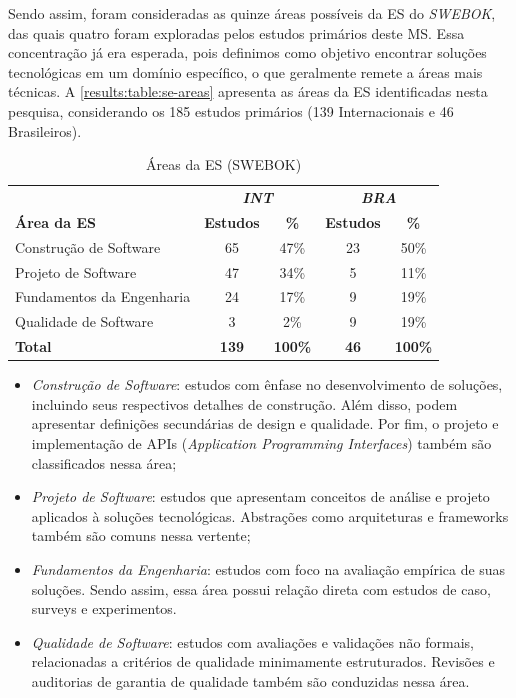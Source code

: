 Sendo assim, foram consideradas as quinze áreas possíveis da ES do \textit{SWEBOK}, das quais quatro foram exploradas pelos estudos primários deste MS. Essa concentração já era esperada, pois definimos como objetivo encontrar soluções tecnológicas em um domínio específico, o que geralmente remete a áreas mais técnicas. A \autoref{results:table:se-areas} apresenta as áreas da ES identificadas nesta pesquisa, considerando os 185 estudos primários (139 Internacionais e 46 Brasileiros).

\begin{table}[htbp]
\caption{Áreas da ES (SWEBOK)}
\label{results:table:se-areas}
\centering
\begin{tabular}{lcccc}
\hline
                          & \multicolumn{2}{c}{\textbf{\textit{INT}}} & \multicolumn{2}{c}{\textbf{\textit{BRA}}} \\ \cline{2-5} 
\textbf{Área da ES}       & \textbf{Estudos} & \textbf{\%}             & \textbf{Estudos} & \textbf{\%}             \\ \hline
Construção de Software    & 65               & 47\%                    & 23               & 50\%                    \\ 
Projeto de Software       & 47               & 34\%                    & 5                & 11\%                    \\ 
Fundamentos da Engenharia & 24               & 17\%                    & 9                & 19\%                    \\ 
Qualidade de Software     & 3                & 2\%                     & 9                & 19\%                    \\ 
\textbf{Total}            & \textbf{139}     & \textbf{100\%} & \textbf{46}      & \textbf{100\%} \\ \hline
\end{tabular}
\fautor
\end{table}

\begin{itemize}
    \item \textit{Construção de Software}: estudos com ênfase no desenvolvimento de soluções, incluindo seus respectivos detalhes de construção. Além disso, podem apresentar definições secundárias de design e qualidade. Por fim, o projeto e implementação de APIs (\textit{Application Programming Interfaces}) também são classificados nessa área;
    \item \textit{Projeto de Software}: estudos que apresentam conceitos de análise e projeto aplicados à soluções tecnológicas. Abstrações como arquiteturas e frameworks também são comuns nessa vertente;
    \item \textit{Fundamentos da Engenharia}: estudos com foco na avaliação empírica de suas soluções. Sendo assim, essa área possui relação direta com estudos de caso, surveys e experimentos.
    \item \textit{Qualidade de Software}: estudos com avaliações e validações não formais, relacionadas a critérios de qualidade minimamente estruturados. Revisões e auditorias de garantia de qualidade também são conduzidas nessa área.
\end{itemize}

